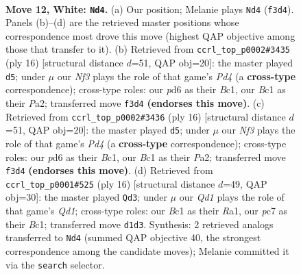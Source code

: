 \documentclass[11pt]{article}
\begin{document}
\begin{figure}[p]
\label{fig:thought-m20}
\end{figure}

\clearpage

\begin{figure}[p]\centering
\begin{subfigure}{0.46\textwidth}\centering
\resizebox{\linewidth}{!}{%
\newchessgame
\chessboard[
  setfen={r1bq1rk1/2pn1pb1/1p1p1np1/p2P3p/2P1p3/2N2NPB/PP2PP1P/R1BQ1RK1 w - - 0 12},
  showmover=false,
  pgfstyle=straightmove, color=movearrow, markmove={f3-d4}
]}
\caption{}
\end{subfigure}\hfill
\begin{subfigure}{0.46\textwidth}\centering
\resizebox{\linewidth}{!}{%
\newchessgame
\chessboard[
  setfen={r1bq1rk1/pp1n1pbp/2pp1np1/4p3/2PPP3/2NB1N2/PP3PPP/R1BQR1K1 w - - 0 9},
  showmover=false,
  pgfstyle=straightmove, color=movearrow, markmove={d4-d5}
]}
\caption{}
\end{subfigure}
\\[4pt]
\begin{subfigure}{0.46\textwidth}\centering
\resizebox{\linewidth}{!}{%
\newchessgame
\chessboard[
  setfen={r1bq1rk1/pp1n1pbp/2pp1np1/4p3/2PPP3/2NB1N2/PP3PPP/R1BQR1K1 w - - 0 9},
  showmover=false,
  pgfstyle=straightmove, color=movearrow, markmove={d4-d5}
]}
\caption{}
\end{subfigure}\hfill
\begin{subfigure}{0.46\textwidth}\centering
\resizebox{\linewidth}{!}{%
\newchessgame
\chessboard[
  setfen={r1bq1rk1/p2nbppp/1pp1pn2/3p4/2PP4/1PN2NP1/P3PPBP/R1BQ1RK1 w - - 2 9},
  showmover=false,
  pgfstyle=straightmove, color=movearrow, markmove={d1-d3}
]}
\caption{}
\end{subfigure}
\caption{\textbf{Move 12, White: \texttt{Nd4}.} (a) Our position; Melanie plays \texttt{Nd4} (\texttt{f3d4}). Panels (b)--(d) are the retrieved master positions whose correspondence most drove this move (highest QAP objective among those that transfer to it). (b) Retrieved from \texttt{ccrl\_top\_p0002\#3435} (ply 16) [structural distance $d$=51, QAP obj=20]: the master played \texttt{d5}; under $\mu$ our \emph{Nf3} plays the role of that game's \emph{Pd4} (a \textbf{cross-type} correspondence); cross-type roles: our \emph{p}d6 as their \emph{B}c1, our \emph{B}c1 as their \emph{P}a2; transferred move \texttt{f3d4} \textbf{(endorses this move)}. (c) Retrieved from \texttt{ccrl\_top\_p0002\#3436} (ply 16) [structural distance $d$=51, QAP obj=20]: the master played \texttt{d5}; under $\mu$ our \emph{Nf3} plays the role of that game's \emph{Pd4} (a \textbf{cross-type} correspondence); cross-type roles: our \emph{p}d6 as their \emph{B}c1, our \emph{B}c1 as their \emph{P}a2; transferred move \texttt{f3d4} \textbf{(endorses this move)}. (d) Retrieved from \texttt{ccrl\_top\_p0001\#525} (ply 16) [structural distance $d$=49, QAP obj=30]: the master played \texttt{Qd3}; under $\mu$ our \emph{Qd1} plays the role of that game's \emph{Qd1}; cross-type roles: our \emph{B}c1 as their \emph{R}a1, our \emph{p}c7 as their \emph{B}c1; transferred move \texttt{d1d3}. Synthesis: 2 retrieved analogs transferred to \texttt{Nd4} (summed QAP objective 40, the strongest correspondence among the candidate moves); Melanie committed it via the \texttt{search} selector.}

\end{figure}
\end{document}
